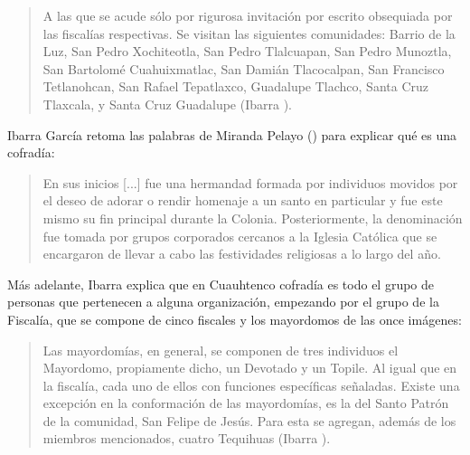 \documentclass[14pt,letterpaper,twoside]{extbook} %
\begin{document}
\begin{quotation}
\noindent A las que se acude sólo por rigurosa invitación por escrito obsequiada por las fiscalías respectivas. Se visitan las siguientes comunidades: Barrio de la Luz, San Pedro Xochiteotla, San Pedro Tlalcuapan, San Pedro Munoztla, San Bartolomé Cuahuixmatlac, San Damián Tlacocalpan, San Francisco Tetlanohcan, San Rafael Tepatlaxco, Guadalupe Tlachco, Santa Cruz Tlaxcala, y Santa Cruz Guadalupe (Ibarra ).
\end{quotation}

\noindent Ibarra García retoma las palabras de Miranda Pelayo () para explicar qué es una cofradía:

\begin{quotation}
\noindent En sus inicios [...] fue una hermandad formada por individuos movidos por el deseo de adorar o rendir homenaje a un santo en particular y fue este mismo su fin principal durante la Colonia. Posteriormente, la denominación fue tomada por grupos corporados cercanos a la Iglesia Católica que se encargaron de llevar a cabo las festividades religiosas a lo largo del año.
\end{quotation}

\noindent Más adelante, Ibarra explica que en Cuauhtenco cofradía es todo el grupo de personas que pertenecen a alguna organización, empezando por el grupo de la Fiscalía, que se compone de cinco fiscales y los mayordomos de las once imágenes:

\begin{quotation}
\noindent Las mayordomías, en general, se componen de tres individuos el Mayordomo, propiamente dicho, un Devotado y un Topile. Al igual que en la fiscalía, cada uno de ellos con funciones específicas señaladas. Existe una excepción en la conformación de las mayordomías, es la del Santo Patrón de la comunidad, San Felipe de Jesús. Para esta se agregan, además de los miembros mencionados, cuatro Tequihuas (Ibarra ).
\end{quotation}
\end{document}

